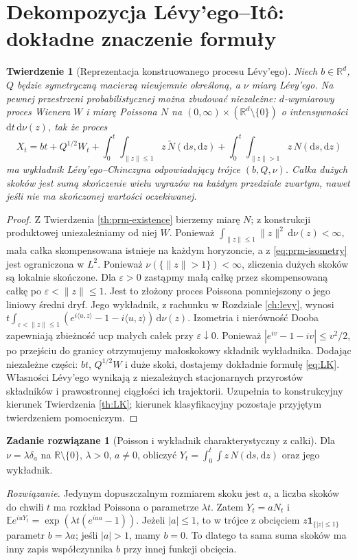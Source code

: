 \documentclass[11pt,a4paper,oneside]{report}
\numberwithin{equation}{chapter}
\theoremstyle{plain}
\newtheorem{twierdzenie}{Twierdzenie}[chapter]
\theoremstyle{definition}
\newtheorem{zadanie}{Zadanie rozwiązane}[chapter]
\theoremstyle{remark}
\newcommand{\R}{\mathbb{R}}
\newcommand{\E}{\mathbb{E}}
\newcommand{\ind}[1]{\mathbf{1}_{#1}}
\newcommand{\dd}{\mathrm{d}}
\begin{document}
\section{Dekompozycja Lévy'ego--Itô: dokładne znaczenie formuły}

\begin{twierdzenie}[Reprezentacja konstruowanego procesu Lévy'ego]
\label{th:levy-ito-made}
Niech $b\in\R^d$, $Q$ będzie symetryczną macierzą
nieujemnie określoną, a $\nu$ miarą Lévy'ego.
Na pewnej przestrzeni probabilistycznej można zbudować
niezależne: $d$-wymiarowy proces Wienera $W$ i miarę
Poissona $N$ na $(0,\infty)\times(\R^d\setminus\{0\})$
o intensywności $\dd t\,\dd\nu(z)$, tak że proces
\[
X_t=bt+Q^{1/2}W_t
+\int_0^t\int_{\|z\|\le1}z\,\widetilde N(\dd s,\dd z)
+\int_0^t\int_{\|z\|>1}z\,N(\dd s,\dd z)
\tag{11.4}\label{eq:levy-ito-made}
\]
ma wykładnik Lévy'ego--Chinczyna odpowiadający trójce
$(b,Q,\nu)$. Całka dużych skoków jest sumą skończenie
wielu wyrazów na każdym przedziale zwartym, nawet jeśli
nie ma skończonej wartości oczekiwanej.
\end{twierdzenie}
\begin{proof}
Z Twierdzenia \ref{th:prm-existence} bierzemy miarę $N$;
z konstrukcji produktowej uniezależniamy od niej $W$.
Ponieważ $\int_{\|z\|\le1}\|z\|^2\,\dd\nu(z)<\infty$,
mała całka skompensowana istnieje na każdym horyzoncie,
a z \eqref{eq:prm-isometry} jest ograniczona w $L^2$.
Ponieważ $\nu(\{\|z\|>1\})<\infty$, zliczenia dużych
skoków są lokalnie skończone. Dla $\varepsilon>0$
zastąpmy małą całkę przez skompensowaną całkę po
$\varepsilon<\|z\|\le1$. Jest to złożony proces
Poissona pomniejszony o jego liniowy średni dryf.
Jego wykładnik, z rachunku w Rozdziale \ref{ch:levy},
wynosi $t\int_{\varepsilon<\|z\|\le1}
(e^{i\langle u,z\rangle}-1-i\langle u,z\rangle)\,\dd\nu(z)$.
Izometria i nierówność Dooba zapewniają zbieżność ucp
małych całek przy $\varepsilon\downarrow0$.
Ponieważ $|e^{iv}-1-iv|\le v^2/2$, po przejściu
do granicy otrzymujemy małoskokowy składnik wykładnika.
Dodając niezależne części: $bt$, $Q^{1/2}W$ i duże skoki,
dostajemy dokładnie formułę \eqref{eq:LK}.
Własności Lévy'ego wynikają z niezależnych stacjonarnych
przyrostów składników i prawostronnej ciągłości ich
trajektorii. Uzupełnia to konstrukcyjny kierunek
Twierdzenia \ref{th:LK}; kierunek klasyfikacyjny pozostaje
przyjętym twierdzeniem pomocniczym.
\end{proof}

\begin{zadanie}[Poisson i wykładnik charakterystyczny z całki]
Dla $\nu=\lambda\delta_a$ na $\R\setminus\{0\}$,
$\lambda>0$, $a\ne0$, obliczyć
$Y_t=\int_0^t\int z\,N(\dd s,\dd z)$ oraz jego wykładnik.

\emph{Rozwiązanie.} Jedynym dopuszczalnym rozmiarem skoku
jest $a$, a liczba skoków do chwili $t$ ma rozkład
Poissona o parametrze $\lambda t$. Zatem $Y_t=aN_t$ i
$\E e^{iuY_t}=\exp(\lambda t(e^{iua}-1))$.
Jeżeli $|a|\le1$, to w trójce z obcięciem $z\ind{\{|z|\le1\}}$
parametr $b=\lambda a$; jeśli $|a|>1$, mamy $b=0$.
To dlatego ta sama suma skoków ma inny zapis współczynnika
$b$ przy innej funkcji obcięcia.
\end{zadanie}
\end{document}
